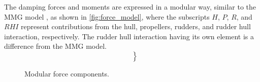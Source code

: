 The damping forces and moments are expressed in a modular way, similar to the MMG model \citep{yasukawaIntroductionMMGStandard2015}, as shown in \autoref{fig:force_model}, where the subscripts $H$, $P$, $R$, and $RHI$ represent contributions from the hull, propellers, rudders, and rudder hull interaction, respectively. The rudder hull interaction having its own element is a difference from the MMG model.
\begin{equation}
    \label{eq:X_D}
    \left.\begin{aligned}
     \\
     \\
    
    \end{aligned}\right\}
\end{equation}
\begin{figure}[h]
    \centering
    
    \caption{Modular force components.}
    \label{fig:force_model}
\end{figure}